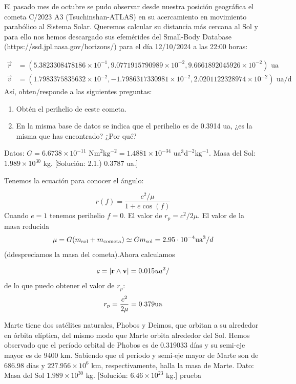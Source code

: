 \begin{texercise}

	El pasado mes de octubre se pudo observar desde nuestra posición geográfica el cometa C/2023 A3 (Tsuchinshan-ATLAS) en su acercamiento en movimiento parabólico al Sistema Solar. Queremos calcular su distancia más cercana al Sol y para ello nos hemos descargado sus efemérides del Small-Body Database (https://ssd.jpl.nasa.gov/horizons/) para el día 12/10/2024 a las 22:00 horas:

	\begin{align*}
		\vec{r} & = (5.3823308478186\times10^{-1}, 9.0771915790989\times10^{-2}, 9.6661892045926\times10^{-2}) \text{ ua}    \\
		\vec{v} & = (1.7983375835632\times10^{-2}, -1.7986317330981\times10^{-2}, 2.0201122328974\times10^{-2}) \text{ ua/d}
	\end{align*}
    Así, obten/responde a las siguientes preguntas:
    \begin{enumerate}[label=\alph*)]
    \item Obtén el perihelio de eeste cometa.
	\item En la misma base de datos se indica que el perihelio es de 0.3914 ua, ¿es la misma que has encontrado? ¿Por qué?
	\end{enumerate}
	Datos: $G = 6.6738 \times 10^{-11} \text{ Nm}^2\text{kg}^{-2} = 1.4881 \times 10^{-34} \text{ ua}^3\text{d}^{-2}\text{kg}^{-1}$. Masa del Sol: $1.989 \times 10^{30}$ kg. [Solución: 2.1.) 0.3787 ua.]
	\tcblower 

	Tenemos la ecuación para conocer el ángulo:

	\begin{equation}
		r(f) = \frac{c^2/ \mu}{1+e\cos(f)}
	\end{equation}
	Cuando $e=1$ tenemos perihelio $f=0$. El valor de $r_p = c^2/2\mu$. El valor de la masa reducida $$\mu=G(m_{\text{sol}}+m_{\text{cometa}})\simeq G m_{\text{sol}} = 2.95\cdot 10^{-4} \text{ua}^3/d$$(ddespreciamos la masa del cometa).Ahora calculamos

	\begin{equation}
		c=|\rn\wedge\vn|=0.015 \*ua^2/
	\end{equation}
	de lo que puedo obtener el valor de $r_p$:
	\begin{equation}
		r_p = \frac{c^2}{2\mu} = 0.379 \text{ua}
	\end{equation}
\end{texercise}

\begin{texercise}
	Marte tiene dos satélites naturales, Phobos y Deimos, que orbitan a su alrededor en órbita elíptica, del mismo modo que Marte orbita alrededor del Sol. Hemos observado que el período orbital de Phobos es de 0.319033 días y su semi-eje mayor es de 9400 km. Sabiendo que el período y semi-eje mayor de Marte son de 686.98 días y $227.956\times10^6$ km, respectivamente, halla la masa de Marte. Dato: Masa del Sol $1.989 \times 10^{30}$ kg. [Solución: $6.46 \times 10^{23}$ kg.]
	\tcblower prueba
\end{texercise}

